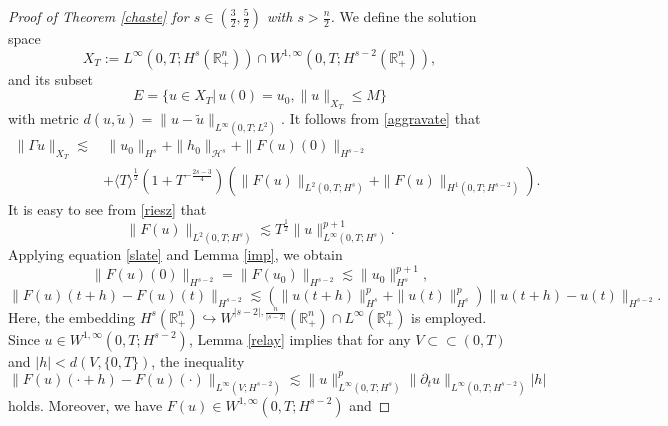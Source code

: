 \documentclass[preprint,compress,12pt]{elsarticle}
\numberwithin{equation}{section}
\begin{document}
\begin{proof}[Proof of Theorem \ref{chaste} for $s\in\left(\frac{3}{2},\frac{5}{2}\right)$ with $s>\frac{n}{2}$]
	We define the solution space
	\begin{equation}
		X_{T}:=L^{\infty}(0,T;H^{s}(\mathbb{R}_{+}^n))\cap W^{1,\infty}(0,T;H^{s-2}(\mathbb{R}_{+}^n)),
	\end{equation}
	and its subset
	\begin{equation*}
		E=\{ u\in X_{T}|\, u(0)=u_{0}, \|u\|_{X_{T}}\leq M \}
	\end{equation*}
	with metric $d(u,\tilde{u})=\|u-\tilde{u}\|_{L^{\infty}(0,T;L^{2})}$. It follows from \eqref{aggravate} that
	\begin{equation}\label{311}
		\begin{aligned}
			\|\Gamma			u\|_{X_{T}}\lesssim&\,\|u_{0}\|_{H^{s}}+\|h_{0}\|_{\mathcal{H}^{s}}+\|F(u)(0)\|_{H^{s-2}}\\
			&+\langle T\rangle ^{\frac{1}{2}}(1+T^{-\frac{2s-3}{4}})\left(\|F(u)\|_{L^{2}(0,T;H^{s})}+\|F(u)\|_{H^{1}(0,T;H^{s-2})}\right).
		\end{aligned}	
	\end{equation}
	It is easy to see from \eqref{riesz} that
	\begin{equation}\label{314}
		\|F(u)\|_{L^{2}(0,T;H^{s})}\lesssim T^{\frac{1}{2}} \|u\|_{L^{\infty}(0,T;H^{s})}^{p+1}.
	\end{equation}
	Applying equation \eqref{slate} and Lemma \ref{imp}, we obtain \begin{equation}\label{impo}
		\|F(u)(0)\|_{H^{s-2}}=\|F(u_{0})\|_{H^{s-2}}\lesssim \|u_{0}\|_{H^{s}}^{p+1},
	\end{equation}
	\begin{equation}
		\|F(u)(t+h)-F(u)(t)\|_{H^{s-2}}
		\lesssim\left(\|u(t+h)\|_{H^{s}}^{p}+\|u(t)\|_{H^{s}}^{p}\right) \|u(t+h)-u(t)\|_{H^{s-2}}.
	\end{equation}
	Here, the embedding $H^{s}(\mathbb{R}_{+}^{n})\hookrightarrow W^{|s-2|,\frac{n}{|s-2|}}(\mathbb{R}_{+}^{n})\cap L^{\infty}(\mathbb{R}_{+}^{n})$ is employed. Since $u\in W^{1,\infty}(0,T;H^{s-2})$, Lemma \ref{relay} implies that for any $V\subset\subset (0,T)$ and $|h|<d(V,\{0,T\})$, the inequality
	\begin{equation*}
		\|F(u)(\cdot+h)-F(u)(\cdot)\|_{L^{\infty}(V;H^{s-2})}\lesssim \|u\|_{L^{\infty}(0,T;H^{s})}^{p} \|\partial_{t}u\|_{L^{\infty}(0,T;H^{s-2})} |h|
	\end{equation*}
	holds. Moreover, we have $F(u)\in W^{1,\infty}(0,T;H^{s-2})$ and

\end{proof}
\end{document}
